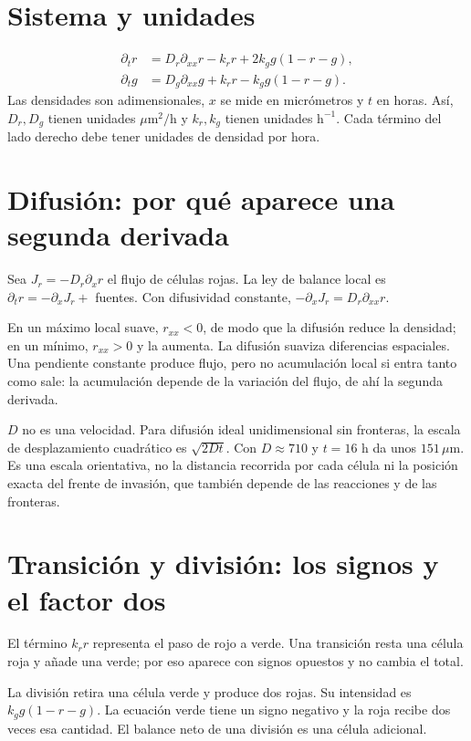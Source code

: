 \documentclass[11pt,a4paper]{report}
\begin{document}
\section{Sistema y unidades}
\begin{align}
\partial_t r&=D_r\partial_{xx}r-k_rr+2k_gg(1-r-g),\label{eq:r}\\
\partial_t g&=D_g\partial_{xx}g+k_rr-k_gg(1-r-g).\label{eq:g}
\end{align}
Las densidades son adimensionales, $x$ se mide en micrómetros y $t$ en horas. Así, $D_r,D_g$ tienen unidades $\mu\mathrm m^2/\mathrm h$ y $k_r,k_g$ tienen unidades $\mathrm h^{-1}$. Cada término del lado derecho debe tener unidades de densidad por hora.

\section{Difusión: por qué aparece una segunda derivada}
Sea $J_r=-D_r\partial_x r$ el flujo de células rojas. La ley de balance local es $\partial_t r=-\partial_xJ_r+$ fuentes. Con difusividad constante, $-\partial_xJ_r=D_r\partial_{xx}r$.

En un máximo local suave, $r_{xx}<0$, de modo que la difusión reduce la densidad; en un mínimo, $r_{xx}>0$ y la aumenta. La difusión suaviza diferencias espaciales. Una pendiente constante produce flujo, pero no acumulación local si entra tanto como sale: la acumulación depende de la variación del flujo, de ahí la segunda derivada.

$D$ no es una velocidad. Para difusión ideal unidimensional sin fronteras, la escala de desplazamiento cuadrático es $\sqrt{2Dt}$. Con $D\approx710$ y $t=16$ h da unos $151\,\mu\mathrm m$. Es una escala orientativa, no la distancia recorrida por cada célula ni la posición exacta del frente de invasión, que también depende de las reacciones y de las fronteras.

\section{Transición y división: los signos y el factor dos}
El término $k_rr$ representa el paso de rojo a verde. Una transición resta una célula roja y añade una verde; por eso aparece con signos opuestos y no cambia el total.

La división retira una célula verde y produce dos rojas. Su intensidad es $k_gg(1-r-g)$. La ecuación verde tiene un signo negativo y la roja recibe dos veces esa cantidad. El balance neto de una división es una célula adicional.
\end{document}
